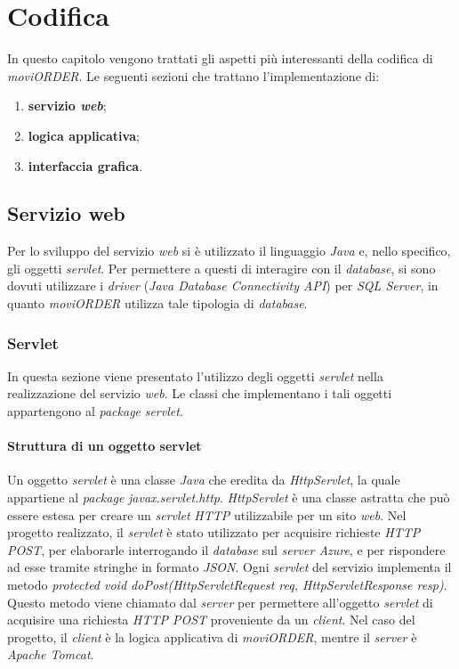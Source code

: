 \chapter{Codifica} \label{codifica}

In questo capitolo vengono trattati gli aspetti più interessanti della codifica di \textit{moviORDER}. Le seguenti sezioni che trattano l'implementazione di:
\begin{enumerate}
	\item \textbf{servizio \textit{web}};
	\item \textbf{logica applicativa};
	\item \textbf{interfaccia grafica}.
\end{enumerate}

\section{Servizio web} \label{codificaservizio}

Per lo sviluppo del servizio \textit{web} si è utilizzato il linguaggio \textit{Java} e, nello specifico, gli oggetti \textit{servlet}. Per permettere a questi di interagire con il \textit{database}, si sono dovuti utilizzare i \textit{driver}  (\textit{Java Database Connectivity API}) per \textit{SQL Server}, in quanto \textit{moviORDER} utilizza tale tipologia di \textit{database}. 

\subsection{Servlet}

In questa sezione viene presentato l'utilizzo degli oggetti \textit{servlet} nella realizzazione del servizio \textit{web}. Le classi che implementano i tali oggetti appartengono al \textit{package} \textit{servlet}.

\subsubsection{Struttura di un oggetto servlet}

Un oggetto \textit{servlet} è una classe \textit{Java} che eredita da \textit{HttpServlet}, la quale appartiene al \textit{package} \textit{javax.servlet.http}. \textit{HttpServlet} è una classe astratta che può essere estesa per creare un \textit{servlet} \textit{HTTP} utilizzabile per un sito \textit{web}. Nel progetto realizzato, il \textit{servlet} è stato utilizzato per acquisire richieste \textit{HTTP POST}, per elaborarle interrogando il \textit{database} sul \textit{server Azure}, e per rispondere ad esse tramite stringhe in formato \textit{JSON}. Ogni \textit{servlet} del servizio implementa il metodo \textit{protected void doPost(HttpServletRequest req, HttpServletResponse resp)}. Questo metodo viene chiamato dal \textit{server} per permettere all'oggetto \textit{servlet} di acquisire una richiesta \textit{HTTP POST} proveniente da un \textit{client}. Nel caso del progetto, il \textit{client} è la logica applicativa di \textit{moviORDER}, mentre il \textit{server} è \textit{Apache Tomcat}.

